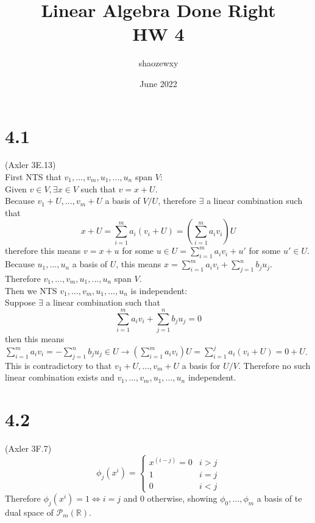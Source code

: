\documentclass{article}
\title{Linear Algebra Done Right\\
\large{HW 4}}
\author{shaozewxy }
\date{June 2022}
\begin{document}
\maketitle

\setcounter{secnumdepth}{0}
\section{4.1}
(Axler 3E.13)\\
First NTS that $v_1, ..., v_m, u_1, ..., u_n$ span $V$:\\
Given $v \in V, \exists x \in V$ such that $v = x + U$.\\
Because $v_1+U, ..., v_m+U$ a basis of $V/U$, therefore $\exists$ a linear combination such that
\begin{equation*}
    x+U = \sum_{i=1}^{m} a_i (v_i+U) = \left(\sum_{i=1}^{m} a_iv_i\right)U
\end{equation*}
therefore this means $v = x + u$ for some $u \in U = \sum_{i=1}^{m} a_iv_i + u'$ for some $u' \in U$.\\
Because $u_1, ..., u_n$ a basis of $U$, this means $x = \sum_{i=1}^{m}a_iv_i + \sum_{j=1}^{n}b_ju_j$.\\
Therefore $v_1, ..., v_m, u_1, ..., u_n$ span $V$.\\
Then we NTS $v_1, ..., v_m, u_1, ..., u_n$ is independent:\\
Suppose $\exists$ a linear combination such that
\begin{equation*}
    \sum_{i=1}^{m}a_iv_i + \sum_{j=1}^{n}b_ju_j = 0
\end{equation*}
then this means $\sum_{i=1}^{m}a_iv_i = -\sum_{j=1}^{n}b_ju_j \in U \rightarrow (\sum_{i=1}^{m}a_iv_i)U = \sum_{i=1}^{j}a_i(v_i+U) = 0+U$. This is contradictory to that $v_1+U, ..., v_m+U$ a basis for $U/V$. Therefore no such linear combination exists and $v_1, ..., v_m, u_1, ..., u_n$ independent.
\section{4.2}
(Axler 3F.7)\\
\begin{equation*}
    \phi_j(x^i) = \begin{cases}
    x^(i-j) = 0 & i > j\\
    1 & i = j\\
    0 & i < j
    \end{cases}
\end{equation*}
Therefore $\phi_j(x^i) = 1 \iff i = j$ and $0$ otherwise, showing $\phi_0, ..., \phi_m$ a basis of te dual space of $\mathcal{P}_m(\mathbb{R})$.
\end{document}
